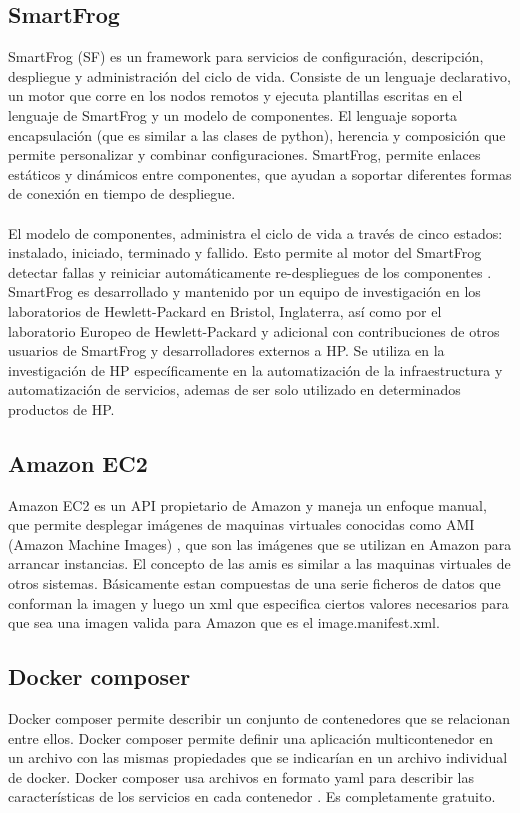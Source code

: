 \subsection{SmartFrog}
SmartFrog (SF) es un framework para servicios de configuración, descripción, despliegue y administración del ciclo de vida. Consiste de un lenguaje declarativo, un motor que corre en los nodos remotos y ejecuta plantillas escritas en el lenguaje de SmartFrog y un modelo de componentes. El lenguaje soporta encapsulación (que es similar a las clases de python), herencia y composición que permite personalizar y combinar configuraciones. SmartFrog, permite enlaces estáticos y dinámicos entre componentes, que ayudan a soportar diferentes formas de conexión en tiempo de despliegue.\\
\\
El modelo de componentes, administra el ciclo de vida a través de cinco estados: instalado, iniciado, terminado y fallido. Esto permite al motor del SmartFrog detectar fallas y reiniciar automáticamente re-despliegues de los componentes \cite{Smart09}.
\\
SmartFrog es desarrollado y mantenido por un equipo de investigación en los laboratorios de Hewlett-Packard en Bristol, Inglaterra, así como por el laboratorio Europeo de Hewlett-Packard y adicional con contribuciones de otros usuarios de SmartFrog y desarrolladores externos a HP. Se utiliza en la investigación de HP específicamente en la automatización de la infraestructura y automatización de servicios, ademas de ser solo utilizado en determinados productos de HP.

\subsection{Amazon EC2}
Amazon EC2 es un API propietario de Amazon y maneja un enfoque manual, que permite desplegar imágenes de maquinas virtuales conocidas como AMI (Amazon Machine Images) \cite{Amazon16}, que son las imágenes que se utilizan en Amazon para arrancar instancias. El concepto de las amis es similar a las maquinas virtuales de otros sistemas. Básicamente estan compuestas de una serie ficheros de datos que conforman la imagen y luego un xml que especifica ciertos valores necesarios para que sea una imagen valida para Amazon que es el image.manifest.xml. 

\subsection{Docker composer}
Docker composer permite describir un conjunto de contenedores que se relacionan entre ellos. Docker composer permite definir una aplicación multicontenedor en un archivo con las mismas propiedades que se indicarían en un archivo individual de docker. Docker composer usa archivos en formato yaml para describir las características de los servicios en cada contenedor \cite{doccom16}. Es completamente gratuito. 

